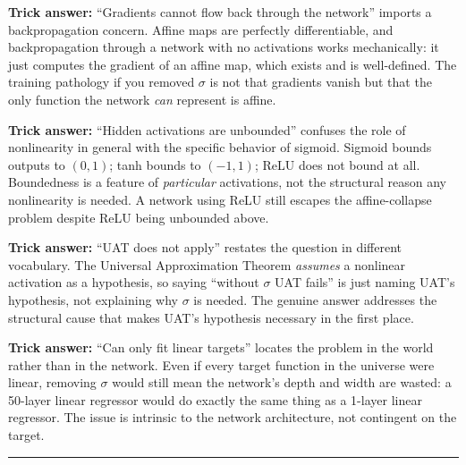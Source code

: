 \documentclass[12pt]{amsart}
\newcommand{\divider}{
  \vspace{-1em}
  \noindent
  \raisebox{-0.15ex}{\textbullet}%
  \hspace{0.5em}%
  \rule[0.5ex]{0.95\textwidth}{1.0pt}%
  \hspace{0.5em}%
  \raisebox{-0.15ex}{\textbullet}%
  \vspace{0em}
}
\begin{document}
\textbf{Trick answer:}
``Gradients cannot flow back through the network'' imports a backpropagation
concern. Affine maps are perfectly differentiable, and backpropagation
through a network with no activations works mechanically: it just computes
the gradient of an affine map, which exists and is well-defined. The
training pathology if you removed $\sigma$ is not that gradients vanish
but that the only function the network \emph{can} represent is affine.

\textbf{Trick answer:}
``Hidden activations are unbounded'' confuses the role of nonlinearity in
general with the specific behavior of sigmoid. Sigmoid bounds outputs to
$(0,1)$; tanh bounds to $(-1,1)$; ReLU does not bound at all. Boundedness
is a feature of \emph{particular} activations, not the structural reason
any nonlinearity is needed. A network using ReLU still escapes the
affine-collapse problem despite ReLU being unbounded above.

\textbf{Trick answer:}
``UAT does not apply'' restates the question in different vocabulary. The
Universal Approximation Theorem \emph{assumes} a nonlinear activation as
a hypothesis, so saying ``without $\sigma$ UAT fails'' is just naming
UAT's hypothesis, not explaining why $\sigma$ is needed. The genuine
answer addresses the structural cause that makes UAT's hypothesis necessary
in the first place.

\textbf{Trick answer:}
``Can only fit linear targets'' locates the problem in the world rather
than in the network. Even if every target function in the universe were
linear, removing $\sigma$ would still mean the network's depth and width
are wasted: a 50-layer linear regressor would do exactly the same thing
as a 1-layer linear regressor. The issue is intrinsic to the network
architecture, not contingent on the target.

\divider
\end{document}
